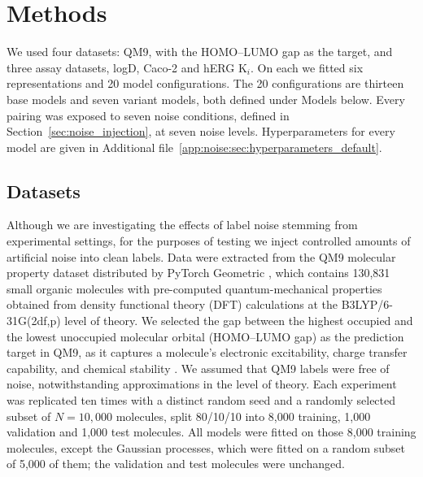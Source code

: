 \section{Methods}\label{sec:robustness:methods}

We used four datasets: QM9, with the HOMO--LUMO gap as the target, and three assay datasets, logD, Caco-2 and hERG K$_i$. On each we fitted six representations and 20 model configurations. The 20 configurations are thirteen base models and seven variant models, both defined under Models below. Every pairing was exposed to seven noise conditions, defined in Section~\ref{sec:noise_injection}, at seven noise levels. Hyperparameters for every model are given in Additional file~\ref{app:noise:sec:hyperparameters_default}.



\subsection{Datasets}

Although we are investigating the effects of label noise stemming from experimental settings, for the purposes of testing we inject controlled amounts of artificial noise into clean labels. Data were extracted from the QM9 molecular property dataset distributed by PyTorch Geometric \citep{Ramakrishnan2014}, which contains 130,831 small organic molecules with pre-computed quantum-mechanical properties obtained from density functional theory (DFT) calculations at the B3LYP/6-31G(2df,p) level of theory. We selected the gap between the highest occupied and the lowest unoccupied molecular orbital (HOMO--LUMO gap) as the prediction target in QM9, as it captures a molecule's electronic excitability, charge transfer capability, and chemical stability \citep{Fediai2023}. We assumed that QM9 labels were free of noise, notwithstanding approximations in the level of theory. Each experiment was replicated ten times with a distinct random seed and a randomly selected subset of $N = 10{,}000$ molecules, split 80/10/10 into 8,000 training, 1,000 validation and 1,000 test molecules. All models were fitted on those 8,000 training molecules, except the Gaussian processes, which were fitted on a random subset of 5,000 of them; the validation and test molecules were unchanged.


